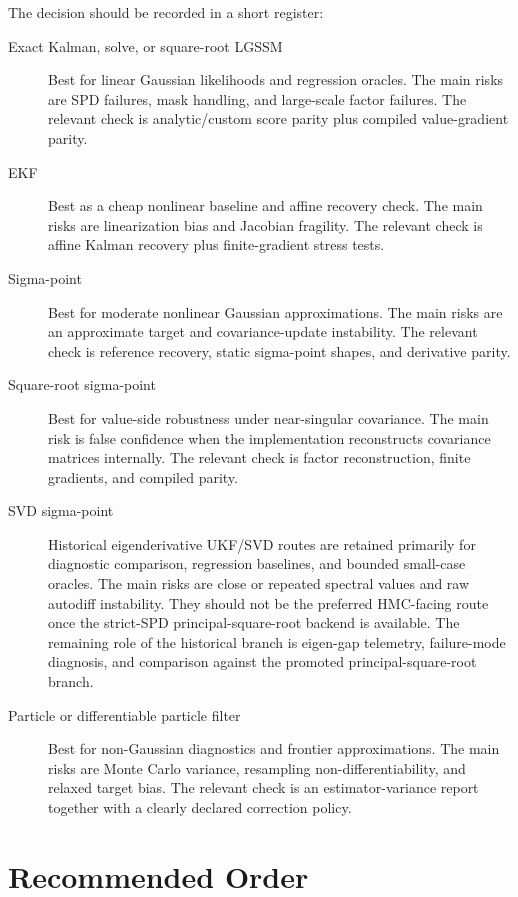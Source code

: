 The decision should be recorded in a short register:
\begin{description}
  \item[Exact Kalman, solve, or square-root LGSSM]
  Best for linear Gaussian likelihoods and regression oracles.  The main risks
  are SPD failures, mask handling, and large-scale factor failures.  The
  relevant check is analytic/custom score parity plus compiled value-gradient
  parity.

  \item[EKF]
  Best as a cheap nonlinear baseline and affine recovery check.  The main risks
  are linearization bias and Jacobian fragility.  The relevant check is affine
  Kalman recovery plus finite-gradient stress tests.

  \item[Sigma-point]
  Best for moderate nonlinear Gaussian approximations.  The main risks are an
  approximate target and covariance-update instability.  The relevant check is
  reference recovery, static sigma-point shapes, and derivative parity.

  \item[Square-root sigma-point]
  Best for value-side robustness under near-singular covariance.  The main risk
  is false confidence when the implementation reconstructs covariance matrices
  internally.  The relevant check is factor reconstruction, finite gradients,
  and compiled parity.

  \item[SVD sigma-point]
  Historical eigenderivative UKF/SVD routes are retained primarily for
  diagnostic comparison, regression baselines, and bounded small-case oracles.
  The main risks are close or repeated spectral values and raw autodiff
  instability.  They should not be the preferred HMC-facing route once the
  strict-SPD principal-square-root backend is available.  The remaining role of
  the historical branch is eigen-gap telemetry, failure-mode diagnosis, and
  comparison against the promoted principal-square-root branch.

  \item[Particle or differentiable particle filter]
  Best for non-Gaussian diagnostics and frontier approximations.  The main
  risks are Monte Carlo variance, resampling non-differentiability, and relaxed
  target bias.  The relevant check is an estimator-variance report together with
  a clearly declared correction policy.
\end{description}

\section{Recommended Order}
\label{sec:bf-filter-choice-order}

